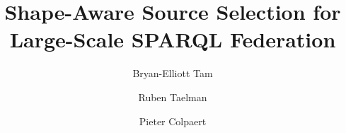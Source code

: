 \documentclass[runningheads]{llncs}
\newif\ifanonymous
\begin{document}
%
\ifanonymous
  \title{Shape-Aware Source Selection for Large-Scale SPARQL Federation}
  \author{Anonymous}
  \institute{Anonymous}
\else
  \title{Shape-Aware Source Selection for Large-Scale SPARQL Federation}
  \author{Bryan-Elliott Tam \and
  Ruben Taelman \and
  Pieter Colpaert}
\fi
%
\maketitle              %
%
\begin{abstract}


\end{abstract}
%






%
%


\end{document}
